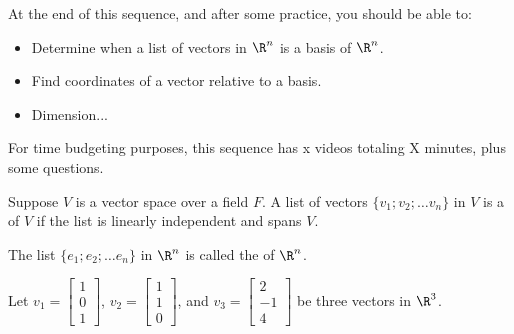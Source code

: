 







At the end of this sequence, and after some practice, you should be able to:

\begin{itemize}
\item Determine when a list of vectors in $\R^n$ is a basis of $\R^n$.    
\item Find coordinates of a vector relative to a basis.  
\item Dimension... 
\end{itemize}


For time budgeting purposes, this sequence has x videos totaling X minutes, 
plus some questions.  




\endedxtext

\endedxvertical








{}  
Suppose $V$ is a vector space over a field $F$.  A list of vectors $\{v_1; v_2; \ldots v_n\}$ in $V$ is a 
{}  
of $V$ if the list is linearly independent and spans $V$.  

{}  
The list $\{e_1; e_2; \ldots e_n\}$ in $\R^n$ is called the {} of $\R^n$.  




\endedxtext

\endedxvertical






Let $v_1 = \left[ \begin{array}{c} 1 \\ 0 \\1 \end{array} \right]$, 
$v_2 = \left[ \begin{array}{c} 1 \\ 1 \\ 0 \end{array} \right]$, and 
$v_3 = \left[ \begin{array}{c} 2 \\ -1 \\ 4 \end{array} \right]$ be three vectors in $\R^3$.  

